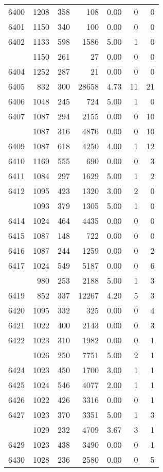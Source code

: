 \documentclass[
]{article}
\begin{document}
\begin{table}
\begin{tabular}[t]{lrrrrrr}
6400 & 1208 & 358 & 108 & 0.00 & 0 & 0\\
6401 & 1150 & 340 & 100 & 0.00 & 0 & 0\\
6402 & 1133 & 598 & 1586 & 5.00 & 1 & 0\\
\addlinespace
6403 & 1150 & 261 & 27 & 0.00 & 0 & 0\\
6404 & 1252 & 287 & 21 & 0.00 & 0 & 0\\
6405 & 832 & 300 & 28658 & 4.73 & 11 & 21\\
6406 & 1048 & 245 & 724 & 5.00 & 1 & 0\\
6407 & 1087 & 294 & 2155 & 0.00 & 0 & 10\\
\addlinespace
6408 & 1087 & 316 & 4876 & 0.00 & 0 & 10\\
6409 & 1087 & 618 & 4250 & 4.00 & 1 & 12\\
6410 & 1169 & 555 & 690 & 0.00 & 0 & 3\\
6411 & 1084 & 297 & 1629 & 5.00 & 1 & 2\\
6412 & 1095 & 423 & 1320 & 3.00 & 2 & 0\\
\addlinespace
6413 & 1093 & 379 & 1305 & 5.00 & 1 & 0\\
6414 & 1024 & 464 & 4435 & 0.00 & 0 & 0\\
6415 & 1087 & 148 & 722 & 0.00 & 0 & 0\\
6416 & 1087 & 244 & 1259 & 0.00 & 0 & 2\\
6417 & 1024 & 549 & 5187 & 0.00 & 0 & 6\\
\addlinespace
6418 & 980 & 253 & 2188 & 5.00 & 1 & 3\\
6419 & 852 & 337 & 12267 & 4.20 & 5 & 3\\
6420 & 1095 & 332 & 325 & 0.00 & 0 & 4\\
6421 & 1022 & 400 & 2143 & 0.00 & 0 & 3\\
6422 & 1023 & 310 & 1982 & 0.00 & 0 & 1\\
\addlinespace
6423 & 1026 & 250 & 7751 & 5.00 & 2 & 1\\
6424 & 1023 & 450 & 1700 & 3.00 & 1 & 1\\
6425 & 1024 & 546 & 4077 & 2.00 & 1 & 1\\
6426 & 1022 & 426 & 3316 & 0.00 & 0 & 1\\
6427 & 1023 & 370 & 3351 & 5.00 & 1 & 3\\
\addlinespace
6428 & 1029 & 232 & 4709 & 3.67 & 3 & 1\\
6429 & 1023 & 438 & 3490 & 0.00 & 0 & 1\\
6430 & 1028 & 236 & 2580 & 0.00 & 0 & 5\\

\end{tabular}
\end{table}
\end{document}
